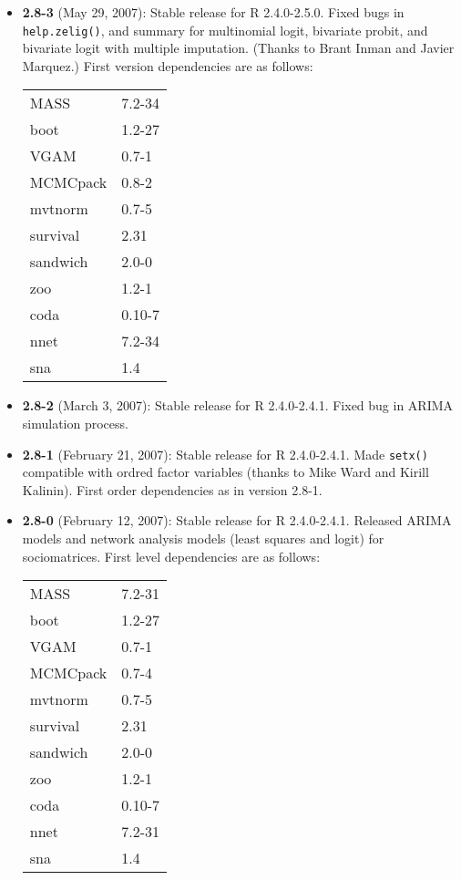 \begin{itemize}
\item {\bf 2.8-3} (May 29, 2007):  Stable release for R 2.4.0-2.5.0.  
Fixed bugs in {\tt help.zelig()}, and summary for multinomial logit, 
bivariate probit, and bivariate logit with multiple imputation.  (Thanks 
to Brant Inman and Javier Marquez.)  First version dependencies are as 
follows:\newline
\begin{tabular}{ll}
     MASS       &   7.2-34 \\
     boot        &  1.2-27 \\
     VGAM        &  0.7-1  \\
     MCMCpack    &  0.8-2  \\
     mvtnorm     &  0.7-5  \\
     survival    &  2.31  \\
     sandwich    &  2.0-0  \\
     zoo         &  1.2-1  \\
     coda        &  0.10-7  \\
     nnet        &  7.2-34 \\
     sna         &  1.4   
\end{tabular}

\item {\bf 2.8-2} (March 3, 2007):  Stable release for R 2.4.0-2.4.1.  
Fixed bug in ARIMA simulation process.  

\item {\bf 2.8-1} (February 21, 2007): Stable release for R
  2.4.0-2.4.1. Made {\tt setx()} compatible with ordred factor variables
  (thanks to Mike Ward and Kirill Kalinin).  First order dependencies as 
  in version 2.8-1.

\item {\bf 2.8-0} (February 12, 2007):  Stable release for R
2.4.0-2.4.1.  Released ARIMA models and network analysis models (least
squares and logit) for sociomatrices.  First level dependencies are as
follows:\newline
\begin{tabular}{ll}
    MASS       &   7.2-31 \\          
    boot       &   1.2-27   \\        
    VGAM       &   0.7-1      \\      
    MCMCpack   &   0.7-4      \\      
    mvtnorm    &   0.7-5       \\     
    survival   &   2.31        \\     
    sandwich   &   2.0-0        \\    
    zoo        &   1.2-1         \\   
    coda       &   0.10-7        \\   
    nnet       &   7.2-31         \\  
    sna        &   1.4  \\
\end{tabular}


\end{itemize}
